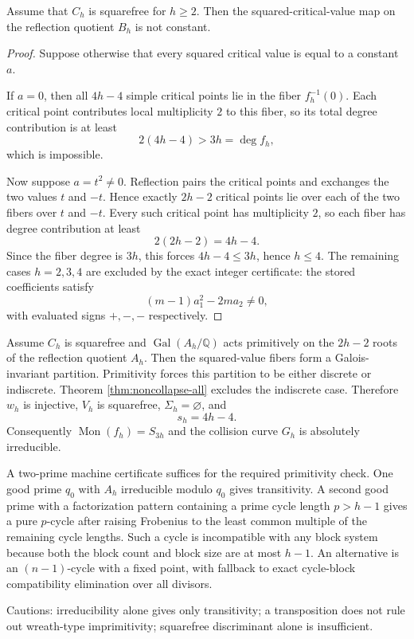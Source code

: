 \begin{theorem}\label{thm:noncollapse-all}
Assume that $C_h$ is squarefree for $h\geq 2$. Then the squared-critical-value map on the reflection quotient $B_h$ is not constant.

\begin{proof}
Suppose otherwise that every squared critical value is equal to a constant $a$.

If $a=0$, then all $4h-4$ simple critical points lie in the fiber $f_h^{-1}(0)$. Each critical point contributes local multiplicity $2$ to this fiber, so its total degree contribution is at least
\[
2(4h-4)>3h=\deg f_h,
\]
which is impossible.

Now suppose $a=t^2\neq 0$. Reflection pairs the critical points and exchanges the two values $t$ and $-t$. Hence exactly $2h-2$ critical points lie over each of the two fibers over $t$ and $-t$. Every such critical point has multiplicity $2$, so each fiber has degree contribution at least
\[
2(2h-2)=4h-4.
\]
Since the fiber degree is $3h$, this forces $4h-4\leq 3h$, hence $h\leq 4$. The remaining cases $h=2,3,4$ are excluded by the exact integer certificate: the stored coefficients satisfy
\[
(m-1)a_1^2-2m a_2\neq 0,
\]
with evaluated signs $+,-,-$ respectively.
\end{proof}
\end{theorem}

\begin{theorem}\label{thm:primitive-morse-sharp}
Assume $C_h$ is squarefree and $\operatorname{Gal}(A_h/\mathbb Q)$ acts primitively on the $2h-2$ roots of the reflection quotient $A_h$. Then the squared-value fibers form a Galois-invariant partition. Primitivity forces this partition to be either discrete or indiscrete. Theorem \ref{thm:noncollapse-all} excludes the indiscrete case. Therefore $w_h$ is injective, $V_h$ is squarefree, $\Sigma_h=\varnothing$, and
\[
s_h=4h-4.
\]
Consequently $\operatorname{Mon}(f_h)=S_{3h}$ and the collision curve $G_h$ is absolutely irreducible.
\end{theorem}

\begin{remark}\label{rem:certificate-protocol}
A two-prime machine certificate suffices for the required primitivity check. One good prime $q_0$ with $A_h$ irreducible modulo $q_0$ gives transitivity. A second good prime with a factorization pattern containing a prime cycle length $p>h-1$ gives a pure $p$-cycle after raising Frobenius to the least common multiple of the remaining cycle lengths. Such a cycle is incompatible with any block system because both the block count and block size are at most $h-1$. An alternative is an $(n-1)$-cycle with a fixed point, with fallback to exact cycle-block compatibility elimination over all divisors.

Cautions: irreducibility alone gives only transitivity; a transposition does not rule out wreath-type imprimitivity; squarefree discriminant alone is insufficient.
\end{remark}

